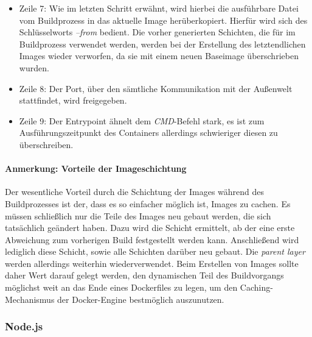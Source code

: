\begin{itemize}
  \item Zeile 7: Wie im letzten Schritt erwähnt, wird hierbei die ausführbare Datei vom Buildprozess in das aktuelle Image herüberkopiert. Hierfür wird sich des Schlüsselworts \emph{--from} bedient. Die vorher generierten Schichten, die für im Buildprozess verwendet werden, werden bei der Erstellung des letztendlichen Images wieder verworfen, da sie mit einem neuen Baseimage überschrieben wurden.

  \item Zeile 8: Der Port, über den sämtliche Kommunikation mit der Außenwelt stattfindet, wird freigegeben. 

  \item Zeile 9: Der Entrypoint ähnelt dem \emph{CMD}-Befehl stark, es ist zum Ausführungszeitpunkt des Containers allerdings schwieriger diesen zu überschreiben.

\end{itemize}


\paragraph{Anmerkung: Vorteile der Imageschichtung} Der wesentliche Vorteil durch die Schichtung der Images während des Buildprozesses ist der, dass es so einfacher möglich ist, Images zu cachen. Es müssen schließlich nur die Teile des Images neu gebaut werden, die sich tatsächlich geändert haben. Dazu wird die Schicht ermittelt, ab der eine erste Abweichung zum vorherigen Build festgestellt werden kann. Anschließend wird lediglich diese Schicht, sowie alle Schichten darüber neu gebaut. Die \emph{parent layer} werden allerdings weiterhin wiederverwendet. Beim Erstellen von Images sollte daher Wert darauf gelegt werden, den dynamischen Teil des Buildvorgangs möglichst weit an das Ende eines Dockerfiles zu legen, um den Caching-Mechanismus der Docker-Engine bestmöglich auszunutzen.

\subsubsection{Node.js}

